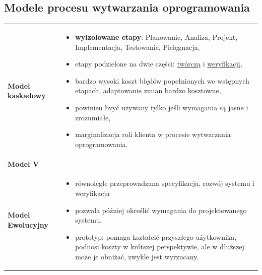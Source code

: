 \documentclass[a4paper]{article}
\begin{document}
    \subsection{Modele procesu wytwarzania oprogramowania}
    \begin{table}[H]
        \begin{center}
            \begin{tabular}{ p{5cm} p{8cm}  }

                \textbf{Model kaskadowy}
                &
                \begin{itemize}
                    \item \textbf{wyizolowane etapy}: Planowanie, Analiza, Projekt, Implementacja, Testowanie, Pielęgnacja,
                    \item etapy podzielone na dwie części: \underline{twórczą} i \underline{weryfikacji},
                    \item bardzo wysoki koszt błędów
                    popełnionych we wstępnych etapach, adaptowanie zmian bardzo kosztowne,
                    \item powinien bvyć używany tylko jeśli wymagania są jasne i zrozumiałe,
                    \item marginalizacja roli klienta w procesie wytwarzania oprogramowania.
                \end{itemize}
                \\

                \cmidrule(r){1-1}\cmidrule(l){2-2}

                \textbf{Model V}
                &

                \\

                \cmidrule(r){1-1}\cmidrule(l){2-2}

                \textbf{Model Ewolucyjny}
                &
                \begin{itemize}
                    \item równolegle przeprowadzana specyfikacja, rozwój systemu i weryfikacja
                    \item pozwala później określić wymagania do projektowanego systemu,
                    \item prototyp: pomaga kształcić przyszłego użytkownika, podnosi koszty
                    w krótszej perspektywie, ale w dłuższej może je obniżać, zwykle jest wyrzucany.
                \end{itemize}
                \\


\end{tabular}
\end{center}
\end{table}
\end{document}
